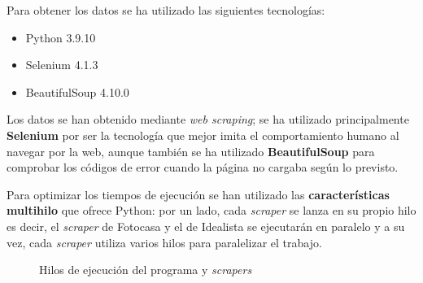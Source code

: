 \documentclass[12pt]{article}
\begin{document}
Para obtener los datos se ha utilizado las siguientes tecnologías:

\begin{multicols}{3}
	\begin{itemize}[topsep=0cm,partopsep=0cm,wide]
		\item Python 3.9.10
		\item Selenium 4.1.3
		\item BeautifulSoup 4.10.0
	\end{itemize}
\end{multicols}\vspace{-10pt}

Los datos se han obtenido mediante \textit{web scraping}; se ha utilizado principalmente \textbf{Selenium} por ser la tecnología que mejor imita el comportamiento humano al navegar por la web, aunque también se ha utilizado \textbf{BeautifulSoup} para comprobar los códigos de error cuando la página no cargaba según lo previsto.

Para optimizar los tiempos de ejecución se han utilizado las \textbf{características multihilo} que ofrece Python: por un lado, cada \textit{scraper} se lanza en su propio hilo \textemdash es decir, el \textit{scraper} de Fotocasa y el de Idealista se ejecutarán en paralelo \textemdash y a su vez, cada \textit{scraper} utiliza varios hilos para paralelizar el trabajo.

\begin{figure}[h]
	\centering
	\caption{\vspace{1.5em}Hilos de ejecución del programa y \textit{scrapers}}
	\vspace{-2em}
\end{figure}
\end{document}
